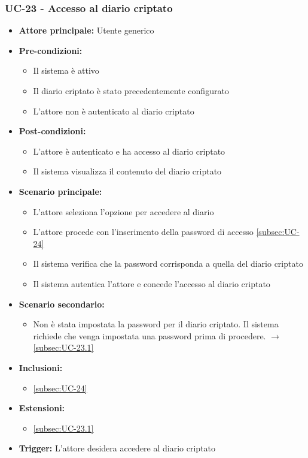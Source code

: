 \documentclass[a4paper,12pt]{article}
\begin{document}
\subsubsection{UC-23 - Accesso al diario criptato} \label{subsec:UC-23}
\begin{itemize}
    \item \textbf{Attore principale:} Utente generico
    \item \textbf{Pre-condizioni:}
    \begin{itemize}
        \item Il sistema è attivo
        \item Il diario criptato è stato precedentemente configurato
        \item L'attore non è autenticato al diario criptato
    \end{itemize}
    \item \textbf{Post-condizioni:} 
    \begin{itemize}
        \item L'attore è autenticato e ha accesso al diario criptato
        \item Il sistema visualizza il contenuto del diario criptato
    \end{itemize}
    \item \textbf{Scenario principale:} 
    \begin{itemize}
        \item L'attore seleziona l'opzione per accedere al diario
        \item L'attore procede con l'inserimento della password di accesso \ref{subsec:UC-24}
        \item Il sistema verifica che la password corrisponda a quella del diario criptato
        \item Il sistema autentica l'attore e concede l'accesso al diario criptato
    \end{itemize}
    \item \textbf{Scenario secondario:} 
    \begin{itemize}
        \item Non è stata impostata la password per il diario criptato. Il sistema richiede che venga impostata una password prima di procedere. $\rightarrow$ \ref{subsec:UC-23.1}
    \end{itemize}
    \item \textbf{Inclusioni:}
    \begin{itemize}
        \item \ref{subsec:UC-24}
    \end{itemize}
    \item \textbf{Estensioni:}
    \begin{itemize}
        \item \ref{subsec:UC-23.1}
    \end{itemize}
    \item \textbf{Trigger:} L'attore desidera accedere al diario criptato
\end{itemize}
\end{document}
